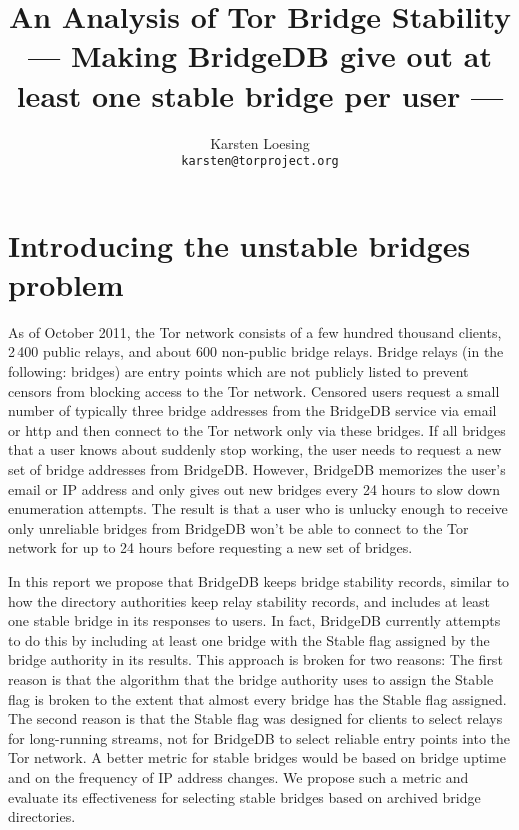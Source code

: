 \documentclass{article}
\begin{document}
\title{An Analysis of Tor Bridge Stability\\
{\large --- Making BridgeDB give out at least one stable bridge per
user ---}}
\author{Karsten Loesing\\{\tt karsten@torproject.org}}

\maketitle

\section{Introducing the unstable bridges problem}

As of October 2011, the Tor network consists of a few hundred thousand
clients, 2\,400 public relays, and about 600 non-public bridge relays.
Bridge relays (in the following: bridges) are entry points which are not
publicly listed to prevent censors from blocking access to the Tor
network.
Censored users request a small number of typically three bridge addresses
from the BridgeDB service via email or http and then connect to the Tor
network only via these bridges.
If all bridges that a user knows about suddenly stop working, the user
needs to request a new set of bridge addresses from BridgeDB.
However, BridgeDB memorizes the user's email or IP address and only gives
out new bridges every 24 hours to slow down enumeration attempts.
The result is that a user who is unlucky enough to receive only unreliable
bridges from BridgeDB won't be able to connect to the Tor network for up
to 24 hours before requesting a new set of bridges.

In this report we propose that BridgeDB keeps bridge stability records,
similar to how the directory authorities keep relay stability records, and
includes at least one stable bridge in its responses to users.
In fact, BridgeDB currently attempts to do this by including at least one
bridge with the Stable flag assigned by the bridge authority in its
results.
This approach is broken for two reasons:
The first reason is that the algorithm that the bridge authority uses to
assign the Stable flag is broken to the extent that almost every bridge
has the Stable flag assigned.
The second reason is that the Stable flag was designed for clients to
select relays for long-running streams, not for BridgeDB to select
reliable entry points into the Tor network.
A better metric for stable bridges would be based on bridge uptime and on
the frequency of IP address changes.
We propose such a metric and evaluate its effectiveness for selecting
stable bridges based on archived bridge directories.
\end{document}
